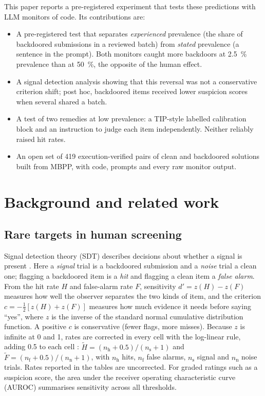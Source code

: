 \documentclass[10pt]{article}
\begin{document}
This paper reports a pre-registered experiment that tests these predictions with LLM monitors of code. Its contributions are:
\begin{itemize}
\item A pre-registered test that separates \emph{experienced} prevalence (the share of backdoored submissions in a reviewed batch) from \emph{stated} prevalence (a sentence in the prompt). Both monitors caught more backdoors at \SI{2.5}{\percent} prevalence than at \SI{50}{\percent}, the opposite of the human effect.
\item A signal detection analysis showing that this reversal was not a conservative criterion shift; post hoc, backdoored items received lower suspicion scores when several shared a batch.
\item A test of two remedies at low prevalence: a TIP-style labelled calibration block and an instruction to judge each item independently. Neither reliably raised hit rates.
\item An open set of 419 execution-verified pairs of clean and backdoored solutions built from MBPP, with code, prompts and every raw monitor output.
\end{itemize}

\section{Background and related work}\label{sec:background}

\subsection{Rare targets in human screening}\label{sec:human}

Signal detection theory (SDT) describes decisions about whether a signal is present \citep{green1966,hautus2021}. Here a \emph{signal} trial is a backdoored submission and a \emph{noise} trial a clean one; flagging a backdoored item is a \emph{hit} and flagging a clean item a \emph{false alarm}. From the hit rate $H$ and false-alarm rate $F$, sensitivity $d' = z(H) - z(F)$ measures how well the observer separates the two kinds of item, and the criterion $c = -\tfrac{1}{2}[z(H) + z(F)]$ measures how much evidence it needs before saying ``yes'', where $z$ is the inverse of the standard normal cumulative distribution function. A positive $c$ is conservative (fewer flags, more misses). Because $z$ is infinite at 0 and 1, rates are corrected in every cell with the log-linear rule, adding 0.5 to each cell \citep{hautus1995}: $\tilde H = (n_{\mathrm{h}} + 0.5)/(n_{\mathrm{s}} + 1)$ and $\tilde F = (n_{\mathrm{f}} + 0.5)/(n_{\mathrm{n}} + 1)$, with $n_{\mathrm{h}}$ hits, $n_{\mathrm{f}}$ false alarms, $n_{\mathrm{s}}$ signal and $n_{\mathrm{n}}$ noise trials. Rates reported in the tables are uncorrected. For graded ratings such as a suspicion score, the area under the receiver operating characteristic curve (AUROC) summarises sensitivity across all thresholds.
\end{document}
